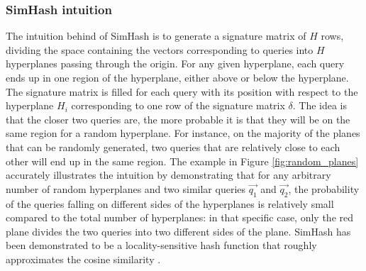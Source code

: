 \subsubsection{SimHash intuition} The intuition behind of SimHash is to generate a signature matrix of $H$ rows, dividing the space containing the vectors corresponding to queries into $H$ hyperplanes passing through the origin. For any given hyperplane, each query ends up in one region of the hyperplane, either above or below the hyperplane. The signature matrix is filled for each query with its position with respect to the hyperplane $H_i$ corresponding to one row of the signature matrix $\delta$. The idea is that the closer two queries are, the more probable it is that they will be on the same region for a random hyperplane. For instance, on the majority of the planes that can be randomly generated, two queries that are relatively close to each other will end up in the same region.  The example in Figure \ref{fig:random_planes} accurately illustrates the intuition by demonstrating that for any arbitrary number of random hyperplanes and two similar queries $\vec{q_1}$ and $\vec{q_2}$, the probability of the queries falling on different sides of the hyperplanes is relatively small compared to the total number of hyperplanes: in that specific case, only the red plane divides the two queries into two different sides of the plane. SimHash has been demonstrated to be a locality-sensitive hash function that roughly approximates the cosine similarity\cite{simhash_demonstration} \cite{simhash_demonstration2}. 


